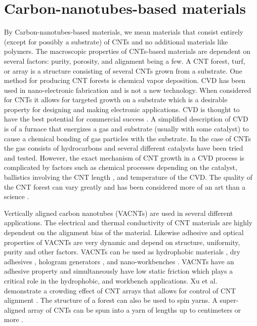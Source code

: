 \section{Carbon-nanotubes-based materials}

By Carbon-nanotubes-based materials, we mean materials that consist entirely (except for possibly a substrate) of CNTs and no additional materials like polymers.	
The macroscopic properties of CNTs-based materials are dependent on several factors: purity, porosity, and alignment being a few.
A CNT forest, turf, or array is a structure consisting of several CNTs grown from a substrate.
One method for producing CNT forests is chemical vapor deposition.
CVD has been used in nano-electronic fabrication and is not a new technology.
When considered for CNTs it allows for targeted growth on a substrate which is a desirable property for designing and making electronic applications.
CVD is thought to have the best potential for commercial success \cite{Nessim2010}.
A simplified description of CVD is of a furnace that energizes a gas and substrate (usually with some catalyst) to cause a chemical bonding of gas particles with the substrate.
In the case of CNTs the gas consists of hydrocarbons and several different catalysts have been tried and tested.
However, the exact mechanism of CNT growth in a CVD process is complicated by factors such as chemical processes depending on the catalyst, ballistics involving the CNT length \cite{Louchev2003}, and temperature of the CVD.
The quality of the CNT forest can vary greatly and has been considered more of an art than a science \cite{Nessim2010}.  
	
Vertically aligned carbon nanotubes (VACNTs) are used in several different applications.
The electrical and thermal conductivity of CNT materials are highly dependent on the alignment bias of the material.
Likewise adhesive and optical properties of VACNTs are very dynamic and depend on structure, uniformity, purity and other factors.
VACNTs can be used as hydrophobic materials \cite{Lau2003}, dry adhesives \cite{Chen2012}, hologram generators \cite{Montelongo2013}, and nano-workbenches \cite{Gjerde2006}.
VACNTs have an adhesive property and simultaneously have low static friction which plays a critical role in the hydrophobic, and workbench applications.
Xu et al. demonstrate a crowding effect of CNT arrays that allows for control of CNT alignment \cite{Xu2012}.
The structure of a forest can also be used to spin yarns.
A super-aligned array of CNTs can be spun into a yarn of lengths up to centimeters or more \cite{Jiang2002}.
	

